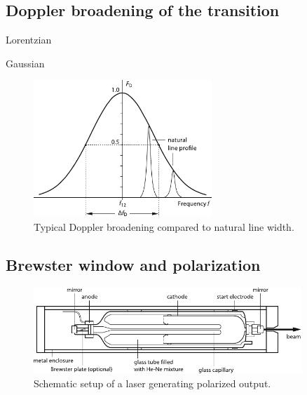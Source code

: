 \subsection{Doppler broadening of the transition}

Lorentzian

Gaussian

\begin{figure}[H]
	\centering
	\includegraphics[width=0.60\textwidth]{content/graphics/broadening.pdf}
	\caption{Typical Doppler broadening compared to natural line width. \cite{Eichler_2018}}
	\label{fig:broadening}
\end{figure}



\subsection{Brewster window and polarization}

\begin{figure}[H]
	\centering
	\includegraphics[width=0.90\textwidth]{content/graphics/setup.pdf}
	\caption{Schematic setup of a \HeNe laser generating polarized output. \cite{Eichler_2018}}
	\label{fig:setup}
\end{figure}
